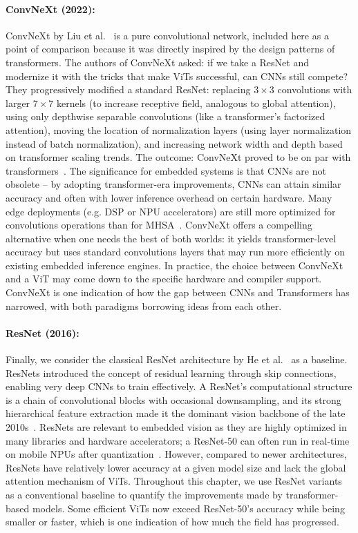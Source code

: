 \documentclass[runningheads,a4paper]{llncs}
\begin{document}
\paragraph{ConvNeXt (2022):} ConvNeXt by Liu et al.~\cite{liu2022convnext} is a pure convolutional network, included here as a point of comparison because it was directly inspired by the design patterns of transformers. The authors of ConvNeXt asked: if we take a ResNet and modernize it with the tricks that make ViTs successful, can CNNs still compete? They progressively modified a standard ResNet: replacing $3\times3$ convolutions with larger $7\times7$ kernels (to increase receptive field, analogous to global attention), using only depthwise separable convolutions (like a transformer’s factorized attention), moving the location of normalization layers (using layer normalization instead of batch normalization), and increasing network width and depth based on transformer scaling trends. The outcome: ConvNeXt proved to be on par with transformers~\cite{liu2022convnext}. The significance for embedded systems is that CNNs are not obsolete – by adopting transformer-era improvements, CNNs can attain similar accuracy and often with lower inference overhead on certain hardware. Many edge deployments (e.g. DSP or NPU accelerators) are still more optimized for convolutions operations than for MHSA~\cite{Zhao2025H4HNAS,LiPaolieriGolubchik2025,Quadric2023ViT}. ConvNeXt offers a compelling alternative when one needs the best of both worlds: it yields transformer-level accuracy but uses standard convolutions layers that may run more efficiently on existing embedded inference engines. In practice, the choice between ConvNeXt and a ViT may come down to the specific hardware and compiler support. ConvNeXt is one indication of how the gap between CNNs and Transformers has narrowed, with both paradigms borrowing ideas from each other.

\paragraph{ResNet (2016):} Finally, we consider the classical ResNet architecture by He et al.~\cite{he2016resnet} as a baseline. ResNets introduced the concept of residual learning through skip connections, enabling very deep CNNs to train effectively. A ResNet’s computational structure is a chain of convolutional blocks with occasional downsampling, and its strong hierarchical feature extraction made it the dominant vision backbone of the late 2010s~\cite{he2016resnet}. ResNets are relevant to embedded vision as they are highly optimized in many libraries and hardware accelerators; a ResNet-50 can often run in real-time on mobile NPUs after quantization~\cite{ignatov2021ai_benchmark,android2025optimization}. However, compared to newer architectures, ResNets have relatively lower accuracy at a given model size and lack the global attention mechanism of ViTs. Throughout this chapter, we use ResNet variants as a conventional baseline to quantify the improvements made by transformer-based models. Some efficient ViTs now exceed ResNet-50's accuracy while being smaller or faster, which is one indication of how much the field has progressed.
\end{document}
